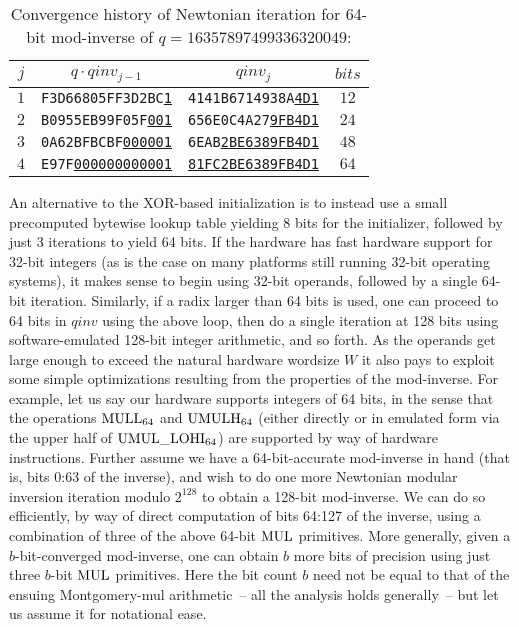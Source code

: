 \documentclass{article}
\begin{document}
\begin{table}[ht]
\begin{center}
\caption{\label{table_iter64}Convergence history of Newtonian iteration for 64-bit mod-inverse of $q = 16357897499336320049$:}
\begin{tabular}{c|c|c|c}
$j$	&	$q \cdot qinv_{j-1}$	&	$qinv_j$ &	$bits$\\
\hline
$1$	& {\tt F3D66805FF3D2BC\underline{1}}	& {\tt 4141B6714938A\underline{4D1}}	&	$12$	\\
$2$	& {\tt B0955EB99F05F\underline{001}}	& {\tt 656E0C4A27\underline{9FB4D1}}	&	$24$	\\
$3$	& {\tt 0A62BFBCBF\underline{000001}}	& {\tt 6EAB\underline{2BE6389FB4D1}}	&	$48$	\\
$4$	& {\tt E97F\underline{000000000001}}	& {\tt \underline{81FC2BE6389FB4D1}}	&	$64$
\end{tabular}
\end{center}
\end{table}


\vspace{-0.1in}
An alternative to the XOR-based initialization is to instead use a small precomputed bytewise lookup table yielding 8 bits for the initializer, followed by just 3 iterations to yield 64 bits. 
If the hardware has fast hardware support for 32-bit integers (as is the case on many platforms still running 32-bit operating systems), it makes sense to begin using 32-bit operands, followed by a single 64-bit iteration. Similarly, if a radix larger than 64 bits is used, one can proceed to 64 bits in $qinv$ using the above loop, then do a single iteration at 128 bits using software-emulated 128-bit integer arithmetic, and so forth. As the operands get large enough to exceed the natural hardware wordsize $W$ it also pays to exploit some simple optimizations resulting from the properties of the mod-inverse. For example, let us say our hardware supports integers of 64 bits, in the sense that the operations ${\rm MULL_{64}}$ and ${\rm UMULH_{64}}$ (either directly or in emulated form via the upper half of ${\rm UMUL\_LOHI_{64}}$) are supported by way of hardware instructions. Further assume we have a 64-bit-accurate mod-inverse in hand (that is, bits 0:63 of the inverse), and wish to do one more Newtonian modular inversion iteration modulo $2^{128}$ to obtain a 128-bit mod-inverse. We can do so efficiently, by way of direct computation of bits 64:127 of the inverse, using a combination of three of the above 64-bit ${\rm MUL}$ primitives. More generally, given a $b$-bit-converged mod-inverse, one can obtain $b$ more bits of precision using just three $b$-bit ${\rm MUL}$ primitives. Here the bit count $b$ need not be equal to that of the ensuing Montgomery-mul arithmetic~-- all the analysis holds generally~-- but let us assume it for notational ease.
\end{document}
